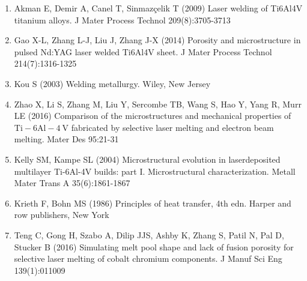 \documentclass[10pt]{article}
\begin{document}
\begin{enumerate}
  \item Akman E, Demir A, Canel T, Sinmazçelik T (2009) Laser welding of Ti6Al4V titanium alloys. J Mater Process Technol 209(8):3705-3713

  \item Gao X-L, Zhang L-J, Liu J, Zhang J-X (2014) Porosity and microstructure in pulsed Nd:YAG laser welded Ti6Al4V sheet. J Mater Process Technol 214(7):1316-1325

  \item Kou S (2003) Welding metallurgy. Wiley, New Jersey

  \item Zhao X, Li S, Zhang M, Liu Y, Sercombe TB, Wang S, Hao Y, Yang R, Murr LE (2016) Comparison of the microstructures and mechanical properties of $\mathrm{Ti}-6 \mathrm{Al}-4 \mathrm{~V}$ fabricated by selective laser melting and electron beam melting. Mater Des 95:21-31

  \item Kelly SM, Kampe SL (2004) Microstructural evolution in laserdeposited multilayer Ti-6Al-4V builds: part I. Microstructural characterization. Metall Mater Trans A 35(6):1861-1867

  \item Krieth F, Bohn MS (1986) Principles of heat transfer, 4th edn. Harper and row publishers, New York

  \item Teng C, Gong H, Szabo A, Dilip JJS, Ashby K, Zhang S, Patil N, Pal D, Stucker B (2016) Simulating melt pool shape and lack of fusion porosity for selective laser melting of cobalt chromium components. J Manuf Sci Eng 139(1):011009

\end{enumerate}
\end{document}

